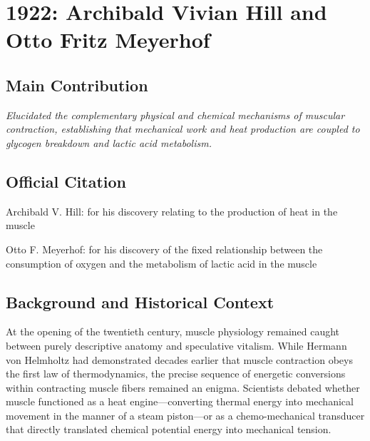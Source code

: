 \chapter[1922 --- Hill et al.]{1922: Archibald Vivian Hill and Otto Fritz Meyerhof}
\label{ch:1922_Hill_Meyerhof}

\section*{Main Contribution}

\textit{Elucidated the complementary physical and chemical mechanisms of muscular contraction, establishing that mechanical work and heat production are coupled to glycogen breakdown and lactic acid metabolism.}\cite{nobel-1922,hill-lecture,meyerhof-lecture}

\section{Official Citation}

Archibald V. Hill: for his discovery relating to the production of heat in the muscle

Otto F. Meyerhof: for his discovery of the fixed relationship between the consumption of oxygen and the metabolism of lactic acid in the muscle

\section{Background and Historical Context}

At the opening of the twentieth century, muscle physiology remained caught between purely descriptive anatomy and speculative vitalism. While Hermann von Helmholtz had demonstrated decades earlier that muscle contraction obeys the first law of thermodynamics, the precise sequence of energetic conversions within contracting muscle fibers remained an enigma. Scientists debated whether muscle functioned as a heat engine—converting thermal energy into mechanical movement in the manner of a steam piston—or as a chemo-mechanical transducer that directly translated chemical potential energy into mechanical tension.

